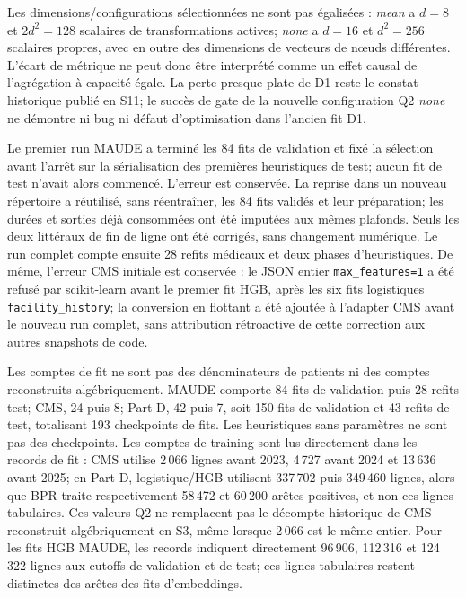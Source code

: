 Les dimensions/configurations sélectionnées ne sont pas égalisées : \emph{mean} a $d=8$ et $2d^2=128$ scalaires de transformations actives; \emph{none} a $d=16$ et $d^2=256$ scalaires propres, avec en outre des dimensions de vecteurs de nœuds différentes. L'écart de métrique ne peut donc être interprété comme un effet causal de l'agrégation à capacité égale. La perte presque plate de D1 reste le constat historique publié en S11; le succès de gate de la nouvelle configuration Q2 \emph{none} ne démontre ni bug ni défaut d'optimisation dans l'ancien fit D1.

Le premier run MAUDE a terminé les 84 fits de validation et fixé la sélection avant l'arrêt sur la sérialisation des premières heuristiques de test; aucun fit de test n'avait alors commencé. L'erreur est conservée. La reprise dans un nouveau répertoire a réutilisé, sans réentraîner, les 84 fits validés et leur préparation; les durées et sorties déjà consommées ont été imputées aux mêmes plafonds. Seuls les deux littéraux de fin de ligne ont été corrigés, sans changement numérique. Le run complet compte ensuite 28 refits médicaux et deux phases d'heuristiques. De même, l'erreur CMS initiale est conservée : le JSON entier \texttt{max\_features=1} a été refusé par scikit-learn avant le premier fit HGB, après les six fits logistiques \texttt{facility\_history}; la conversion en flottant a été ajoutée à l'adapter CMS avant le nouveau run complet, sans attribution rétroactive de cette correction aux autres snapshots de code.

Les comptes de fit ne sont pas des dénominateurs de patients ni des comptes reconstruits algébriquement. MAUDE comporte 84 fits de validation puis 28 refits test; CMS, 24 puis 8; Part D, 42 puis 7, soit 150 fits de validation et 43 refits de test, totalisant 193 checkpoints de fits. Les heuristiques sans paramètres ne sont pas des checkpoints. Les comptes de training sont lus directement dans les records de fit : CMS utilise 2\,066 lignes avant 2023, 4\,727 avant 2024 et 13\,636 avant 2025; en Part D, logistique/HGB utilisent 337\,702 puis 349\,460 lignes, alors que BPR traite respectivement 58\,472 et 60\,200 arêtes positives, et non ces lignes tabulaires. Ces valeurs Q2 ne remplacent pas le décompte historique de CMS reconstruit algébriquement en S3, même lorsque 2\,066 est le même entier. Pour les fits HGB MAUDE, les records indiquent directement 96\,906, 112\,316 et 124\,322 lignes aux cutoffs de validation et de test; ces lignes tabulaires restent distinctes des arêtes des fits d'embeddings.

